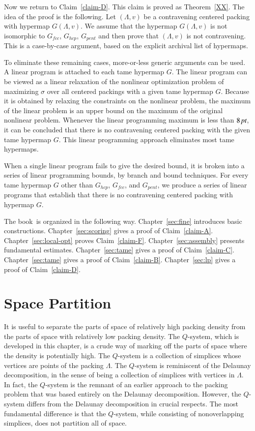 Now we return to Claim~\ref{claim-D}. This claim is proved as
Theorem~\ref{XX}.  The idea of the proof is the
following.  Let $(\Lambda,v)$ be a contravening centered packing with
hypermap $G(\Lambda,v)$. We assume that the hypermap $G(\Lambda,v)$ is not
isomorphic to $G_{fcc}$, $G_{hcp}$, $G_{pent}$ and then prove that
$(\Lambda,v)$ is not contravening. This is a case-by-case argument, based on
the explicit archival list of hypermaps.

To eliminate these remaining cases, more-or-less generic arguments
can be used.  A linear program is attached to each tame hypermap
$G$. The linear program can be viewed as a linear relaxation of
the nonlinear optimization problem of maximizing $\sigma$ over all
centered packings with a given tame hypermap $G$. Because it is
obtained by relaxing the constraints on the nonlinear problem, the
maximum of the linear problem is an upper bound on the maximum of
the original nonlinear problem. Whenever the linear programming
maximum is less than $8\,\hbox{\it pt}$, it can be concluded that there is
no contravening centered packing with the given tame hypermap $G$.
This linear programming approach eliminates most tame hypermaps.

When a single linear program fails to give the desired bound, it
is broken into a series of linear programming bounds, by branch
and bound techniques.  For every tame hypermap $G$ other than
$G_{hcp}$, $G_{fcc}$, and $G_{pent}$, we
produce a series of linear programs that establish that there is
no contravening centered packing with hypermap $G$.

The book~is organized in the following way.
Chapter~\ref{sec:fine} introduces
basic constructions.  Chapter~\ref{sec:scoring} gives a proof of
Claim~\ref{claim-A}. Chapter~\ref{sec:local-opt} proves
Claim~\ref{claim-F}. Chapter~\ref{sec:assembly}
presents  fundamental estimates. Chapter~\ref{sec:tame}
gives a proof of
Claim~\ref{claim-C}. Chapter~\ref{sec:tame} gives 
a proof of Claim~\ref{claim-B}.
Chapter~\ref{sec:lp} gives
a proof of Claim~\ref{claim-D}.


\section{Space Partition}





It is useful to separate the parts of space of relatively high
packing density from the parts of space with relatively low
packing density.  The $Q$-system, which is developed in this
chapter, is a crude way of marking off the parts of space where the
density is potentially high.  The $Q$-system is a collection of
simplices whose vertices are points of the packing $\Lambda$. The
$Q$-system is reminiscent of the Delaunay decomposition, in the
sense of being a collection of simplices with vertices in
$\Lambda$.  In fact, the $Q$-system is the remnant of an earlier
approach to the packing problem that was based entirely on the
Delaunay decomposition.  However, the $Q$-system differs from the
Delaunay decomposition in crucial respects.  The most fundamental
difference is that the $Q$-system, while consisting of
nonoverlapping simplices, does not partition all of space.


